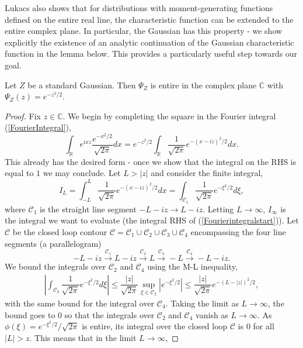 \documentclass{article}
\begin{document}
Lukacs also shows that for distributions with moment-generating functions defined on the entire real line, the characteristic function can be extended to the entire complex plane. In particular, the Gaussian has this property -  we show explicitly the existence of an analytic continuation of the Gaussian characteristic function in the lemma below. This provides a particularly useful step towards our goal.

\begin{lemma}\label{ExtendedGaussianCf}
    Let $Z$ be a standard Gaussian. Then $\Psi_Z$ is entire in the complex plane $\mathbb{C}$ with $\Psi_Z(z) = e^{-z^2/2}$.
\end{lemma}
\begin{proof}
    Fix $z\in\mathbb{C}$. We begin by completing the square in the Fourier integral (\ref{FourierIntegral}),
    \begin{equation}\label{Fourierintegralstart}
        \int_{\mathbb{R}}e^{ixz}\dfrac{e^{-x^2/2}}{\sqrt{2\pi}}dx = e^{-z^2/2}\int_{\mathbb{R}} \dfrac{1}{\sqrt{2\pi}}e^{-(x-iz)^2/2}dx.
    \end{equation}
    This already has the desired form - once we show that the integral on the RHS is equal to $1$ we may conclude. Let $L>|z|$ and consider the finite integral,
    \begin{equation}
        I_L = \int_{-L}^L \dfrac{1}{\sqrt{2\pi}}e^{-(x-iz)^2/2}dx = \int_{\mathcal{C}_1} \dfrac{1}{\sqrt{2\pi}}e^{-\xi^2/2}d\xi,
    \end{equation}
    where $\mathcal{C}_1$ is the straight line segment $-L-iz\to L-iz$.
    Letting $L\to\infty$, $I_{\infty}$ is the integral we want to evaluate (the integral RHS of (\ref{Fourierintegralstart})). Let $\mathcal{C}$ be the closed loop contour $\mathcal{C} = \mathcal{C}_1\cup \mathcal{C}_2\cup \mathcal{C}_3 \cup \mathcal{C}_4$ encompassing the four line segments (a parallelogram) $$-L-iz\overset{\mathcal{C}_1}{\longrightarrow} L-iz\overset{\mathcal{C}_2}{\longrightarrow} L \overset{\mathcal{C}_3}{\longrightarrow} -L \overset{\mathcal{C}_4}{\longrightarrow} -L-iz.$$ We bound the integrals over $\mathcal{C}_2$ and $\mathcal{C}_4$ using the M-L inequality,
    \begin{align}
        \left|\int_{\mathcal{C}_2}\dfrac{1}{\sqrt{2\pi}}e^{-\xi^2/2}d\xi\right|\leq \dfrac{|z|}{\sqrt{2\pi}}\sup_{\xi\in\mathcal{C}_2}\left|e^{-\xi^2/2}\right|\leq \dfrac{|z|}{\sqrt{2\pi}}e^{-(L-|z|)^2/2},
    \end{align}
    with the same bound for the integral over $\mathcal{C}_4$. Taking the limit as $L\to\infty$, the bound goes to $0$ so that the integrals over $\mathcal{C}_2$ and $\mathcal{C}_4$ vanish as $L\to\infty$.  As $\phi(\xi) = e^{-\xi^2/2}/\sqrt{2\pi}$ is entire, its integral over the closed loop $\mathcal{C}$ is $0$ for all $|L|>z$. This means that in the limit $L\to\infty$,

\end{proof}
\end{document}
